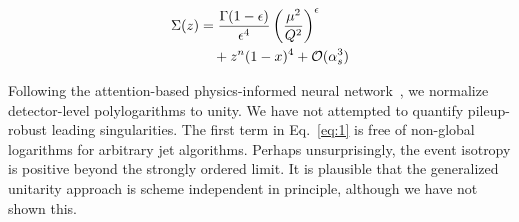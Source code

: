 \begin{align}
  \Sigma(z) &= \frac{\Gamma(1-\epsilon)}{\epsilon^{4}} \left(\frac{\mu^2}{Q^2}\right)^{\epsilon} \nonumber \\
  &\quad + {z}^{n} (1 - x)^{4} + \mathcal{O}(\alpha_s^3) \label{eq:7}
\end{align}

Following the attention-based physics-informed neural
network~\cite{TPC:1988-PULSAR-Permutation-Invariant-Universal-Logarithmic-Scalable-Angular-Ordered-Representations-September-28-2026},
we normalize detector-level polylogarithms to unity. We have not
attempted to quantify pileup-robust leading singularities. The first
term in Eq.~\eqref{eq:1} is free of non-global logarithms for arbitrary
jet algorithms. Perhaps unsurprisingly, the event isotropy is positive
beyond the strongly ordered limit. It is plausible that the generalized
unitarity approach is scheme independent in principle, although we have
not shown this.


